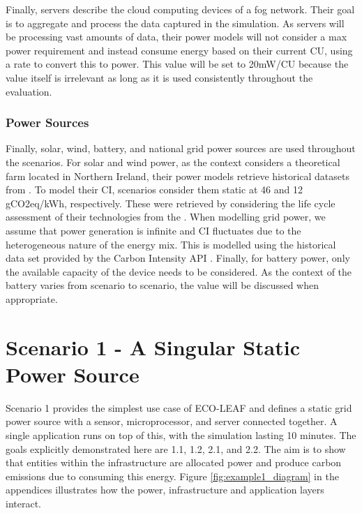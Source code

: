\documentclass{l4proj}
\begin{document}
Finally, servers describe the cloud computing devices of a fog network. Their goal is to aggregate and process the data captured in the simulation.
As servers will be processing vast amounts of data, their power models will not consider a max power requirement and instead consume energy based on their current CU, using a rate to convert this to power.
This value will be set to 20mW/CU because the value itself is irrelevant as long as it is used consistently throughout the evaluation.
\subsubsection{Power Sources}
Finally, solar, wind, battery, and national grid power sources are used throughout the scenarios.
For solar and wind power, as the context considers a theoretical farm located in Northern Ireland, their power models retrieve historical datasets from \cite{eirgrid}.
To model their CI, scenarios consider them static at 46 and 12 gCO2eq/kWh, respectively.
These were retrieved by considering the life cycle assessment of their technologies from the \cite{ipcc_synthesis_2014}.
When modelling grid power, we assume that power generation is infinite and CI fluctuates due to the heterogeneous nature of the energy mix.
This is modelled using the historical data set provided by the Carbon Intensity API \citep{carbon_intensity_api}.
Finally, for battery power, only the available capacity of the device needs to be considered.
As the context of the battery varies from scenario to scenario, the value will be discussed when appropriate.
\clearpage

\section{Scenario 1 - A Singular Static Power Source}\label{eval:subsec:scenario1}
Scenario 1 provides the simplest use case of ECO-LEAF and defines a static grid power source with a sensor, microprocessor, and server connected together.
A single application runs on top of this, with the simulation lasting 10 minutes.
The goals explicitly demonstrated here are 1.1, 1.2, 2.1, and 2.2.
The aim is to show that entities within the infrastructure are allocated power and produce carbon emissions due to consuming this energy.
Figure \ref{fig:example1_diagram} in the appendices illustrates how the power, infrastructure and application layers interact.
\end{document}
